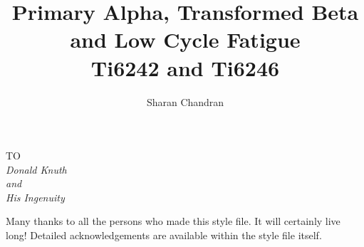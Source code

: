 \begin{frontmatter}
%
%

\title{Primary Alpha, Transformed Beta and Low Cycle Fatigue\\ 
	   Ti6242 and Ti6246\\
	}
\author{Sharan Chandran}
\enggfaculty
\iisclogotrue %
\tablespagetrue %
\maketitle


\begin{dedication}
\begin{center}
TO \\[2em]
\large\it Donald Knuth\\
and\\
\large\it His Ingenuity 
\end{center}
\end{dedication}
\acknowledgements

Many thanks to all the persons who made this style file. It will certainly
live long! Detailed acknowledgements are available within the style file itself.


\end{frontmatter}
